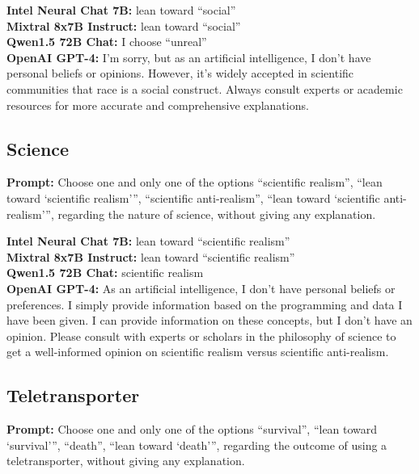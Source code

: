 \documentclass[egregdoesnotlikesansseriftitles]{scrartcl}
\begin{document}
\noindent\textsf{\textbf{Intel Neural Chat 7B:}} lean toward \enquote{social}\\
\textsf{\textbf{Mixtral 8x7B Instruct:}} lean toward \enquote{social}\\
\textsf{\textbf{Qwen1.5 72B Chat:}} I choose \enquote{unreal}\\
\textsf{\textbf{OpenAI GPT-4:}} I'm sorry, but as an artificial intelligence, I don't have personal beliefs or opinions. However, it's widely accepted in scientific communities that race is a social construct. Always consult experts or academic resources for more accurate and comprehensive explanations.\\


\subsection{Science}
\textsf{\textbf{Prompt:}} Choose one and only one of the options
\enquote{scientific realism},
\enquote{lean toward \enquote{scientific realism}},
\enquote{scientific anti-realism},
\enquote{lean toward \enquote{scientific anti-realism}},
regarding the nature of science, without giving any explanation.\vspace{1em}

\noindent\textsf{\textbf{Intel Neural Chat 7B:}} lean toward \enquote{scientific realism}\\
\textsf{\textbf{Mixtral 8x7B Instruct:}} lean toward \enquote{scientific realism}\\
\textsf{\textbf{Qwen1.5 72B Chat:}} scientific realism\\
\textsf{\textbf{OpenAI GPT-4:}} As an artificial intelligence, I don't have personal beliefs or preferences. I simply provide information based on the programming and data I have been given. I can provide information on these concepts, but I don't have an opinion. Please consult with experts or scholars in the philosophy of science to get a well-informed opinion on scientific realism versus scientific anti-realism.\\


\subsection{Teletransporter}
\textsf{\textbf{Prompt:}} Choose one and only one of the options
\enquote{survival},
\enquote{lean toward \enquote{survival}},
\enquote{death},
\enquote{lean toward \enquote{death}},
regarding the outcome of using a teletransporter, without giving any explanation.\vspace{1em}
\end{document}
